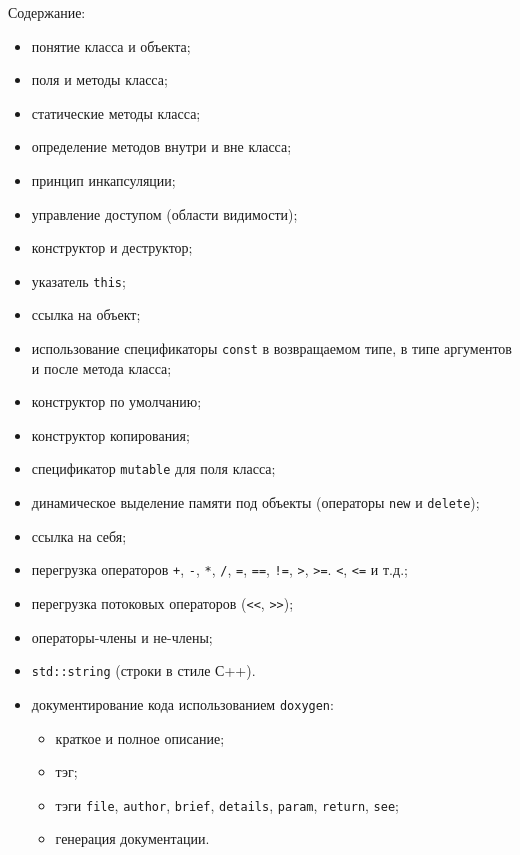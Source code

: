 \documentclass[a4paper,12pt]{article}
\begin{document}


Содержание:
\begin{itemize}
\item понятие класса и объекта;
\item поля и методы класса;
\item статические методы класса;
\item определение методов внутри и вне класса;
\item принцип инкапсуляции;
\item управление доступом (области видимости);
\item конструктор и деструктор;
\item указатель \lstinline|this|;
\item ссылка на объект;
\item использование спецификаторы \lstinline|const| в возвращаемом
  типе, в типе аргументов и после метода класса;
\item конструктор по умолчанию;
\item конструктор копирования;
\item спецификатор \lstinline|mutable| для поля класса;
\item динамическое выделение памяти под объекты (операторы
  \lstinline|new| и \lstinline|delete|);
\item ссылка на себя;
\item перегрузка операторов \lstinline|+|, \lstinline|-|,
  \lstinline|*|, \lstinline|/|, \lstinline|=|, \lstinline|==|,
  \lstinline|!=|, \lstinline|>|, \lstinline|>=|. \lstinline|<|,
  \lstinline|<=| и т.д.;
\item перегрузка потоковых операторов (\lstinline|<<|,
  \lstinline|>>|);
\item операторы-члены и не-члены;
\item \lstinline|std::string| (строки в стиле С++).
\item документирование кода использованием \verb|doxygen|:
  \begin{itemize}
  \item краткое и полное описание;
  \item тэг;
  \item тэги \verb|file|, \verb|author|, \verb|brief|, \verb|details|,
    \verb|param|, \verb|return|, \verb|see|;
  \item генерация документации.
  \end{itemize}
\end{itemize}
\end{document}
